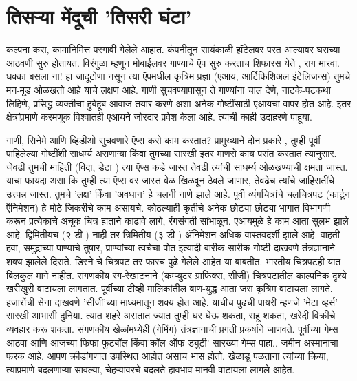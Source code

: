 \chapter{तिसऱ्या मेंदूची 'तिसरी घंटा'}

कल्पना करा, कामानिमित्त परगावी गेलेले आहात. कंपनीतून सायंकाळी हॉटेलवर परत आल्यावर घराच्या आठवणी सुरु होतायत. विरंगुळा म्हणून मोबाईलवर गाण्याचे ऍप सुरु करताच शिफारस येते , राग मारवा.  धक्का बसला ना! हा जादूटोणा नसून त्या ऍपमधील कृत्रिम प्रज्ञा (एआय, आर्टिफिशिअल इंटेलिजन्स) तुमचे मन-मूड ओळखतो आहे याचे लक्षण आहे. गाणी सुचवण्यापासून ते गाण्यांना चाल देणे, नाटके-पटकथा लिहिणे, प्रसिद्ध व्यक्तीचा हुबेहूब आवाज तयार करणे अशा अनेक गोष्टींसाठी एआयचा वापर होत आहे. इतर क्षेत्रांप्रमाणे करमणूक विश्वातही एआयने जोरदार प्रवेश केला आहे. त्याची काही उदाहरणे पाहूया.

गाणी, सिनेमे आणि व्हिडीओ सुचवणारे ऍप्स कसे काम करतात? प्रामुख्याने दोन प्रकारे , तुम्ही पूर्वी पाहिलेल्या गोष्टींशी साधर्म्य असणाऱ्या किंवा तुमच्या सारखी इतर माणसे काय पसंत करतात त्यानुसार. जेवढी तुमची माहिती (विदा, डेटा ) त्या ऍप्स कडे जास्त तेवढी त्यांची साधर्म्य ओळखण्याची क्षमता जास्त. याचा फायदा असा कि तुम्ही त्या ऍप्स वर जास्त वेळ खिळवून ठेवले जाणार, तेवढेच त्यांचे जाहिरातींचे उत्त्पन्न जास्त. तुमचे 'लक्ष' किंवा 'अवधान' हे चलनी नाणे झाले आहे.  पूर्वी व्यंगचित्रांचे चलचित्रपट (कार्टून ऍनिमेशन) हे मोठे जिकरीचे काम असायचे. कोठल्याही कृतीचे अनेक छोट्या छोट्या भागात विभागणी करून प्रत्येकाचे अचूक चित्र हाताने काढावे लागे, रंगसंगती सांभाळून. एआयमुळे हे काम आता सुलभ झाले आहे. द्विमितीयच (२ डी ) नाही तर त्रिमितीय (३ डी ) ॲनिमेशन अधिक वास्तवदर्शी झाले आहे. वाहती हवा, समुद्राच्या पाण्याचे तुषार, प्राण्यांच्या त्वचेचा पोत इत्यादी बारीक सारीक गोष्टी दाखवणे तंत्रज्ञानाने शक्य झालेले दिसते. डिस्ने चे चित्रपट तर फारच पुढे गेलेले आहेत या बाबतीत.  भारतीय चित्रपटही यात बिलकुल मागे नाहीत. संगणकीय रंग-रेखाटनाने (कम्प्युटर ग्राफिक्स, सीजी) चित्रपटातील काल्पनिक दृश्ये खरीखुरी वाटायला लागतात. पूर्वीच्या टीव्ही मालिकांतील बाण-युद्ध आता जरा कृत्रिम वाटायला लागते. हजारोंची सेना दाखवणे 'सीजी'च्या माध्यमातून शक्य होत आहे. याचीच पुढची पायरी म्हणजे 'मेटा व्हर्स' सारखी आभासी दुनिया. त्यात शहरे असतात ज्यात तुम्ही घर घेऊ शकता, राहू शकता, खरेदी विक्रीचे व्यवहार करू शकता.  संगणकीय खेळांमध्येही (गेमिंग) तंत्रज्ञानाची प्रगती प्रकर्षाने जाणवते. पूर्वीच्या गेम्स आठवा आणि आजच्या फिफा फुटबॉल किंवा'कॉल ऑफ ड्युटी' सारख्या गेम्स पाहा.. जमीन-अस्मानाचा फरक आहे. आपण क्रीडांगणात उपस्थित आहोत असाच भास होतो. खेळाडू पळताना त्यांच्या क्रिया, त्याप्रमाणे बदलणाऱ्या सावल्या, चेहऱ्यावरचे बदलते हावभाव मानवी वाटायला लागले आहेत.

